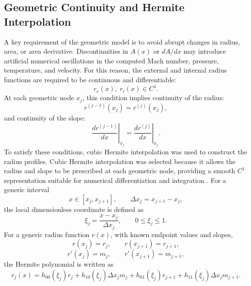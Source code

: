 \documentclass[preprint,12pt]{elsarticle}
\begin{document}
\subsection{Geometric Continuity and Hermite Interpolation}
A key requirement of the geometric model is to avoid abrupt changes in radius, area, or area derivative. Discontinuities in $A(x)$ or $dA/dx$ may introduce artificial numerical oscillations in the computed Mach number, pressure, temperature, and velocity. For this reason, the external and internal radius functions are required to be continuous and differentiable:
\begin{equation}
r_e(x),\; r_i(x) \in C^1.
\label{eq:c1_condition}
\end{equation}
At each geometric node $x_j$, this condition implies continuity of the radius:
\begin{equation}
r^{(j-1)}(x_j)=r^{(j)}(x_j),
\label{eq:radius_continuity}
\end{equation}
and continuity of the slope:
\begin{equation}
\left.
\frac{dr^{(j-1)}}{dx}
\right|_{x_j}
=
\left.
\frac{dr^{(j)}}{dx}
\right|_{x_j}.
\label{eq:slope_continuity}
\end{equation}
To satisfy these conditions, cubic Hermite interpolation was used to construct the radius profiles. Cubic Hermite interpolation was selected because it allows the radius and slope to be prescribed at each geometric node, providing a smooth $C^1$ representation suitable for numerical differentiation and integration \cite{Burden2011}. For a generic interval
\begin{equation}
x\in[x_j,x_{j+1}],
\qquad
\Delta x_j=x_{j+1}-x_j,
\end{equation}
the local dimensionless coordinate is defined as
\begin{equation}
\xi_j=\frac{x-x_j}{\Delta x_j},
\qquad
0\leq \xi_j \leq 1.
\end{equation}
For a generic radius function $r(x)$, with known endpoint values and slopes,
\begin{equation}
r(x_j)=r_j,\qquad r(x_{j+1})=r_{j+1},
\end{equation}
\begin{equation}
r'(x_j)=m_j,\qquad r'(x_{j+1})=m_{j+1},
\end{equation}
the Hermite polynomial is written as
\begin{equation}
r_j(x)
=
h_{00}(\xi_j)r_j
+
h_{10}(\xi_j)\Delta x_jm_j
+
h_{01}(\xi_j)r_{j+1}
+
h_{11}(\xi_j)\Delta x_jm_{j+1}.
\label{eq:hermite_polynomial}
\end{equation}
\end{document}
